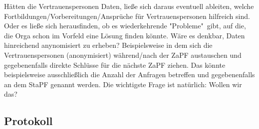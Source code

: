     Hätten die Vertrauenspersonen Daten, ließe sich daraus eventuell ableiten, welche Fortbildungen/Vorbereitungen/Ansprüche für Vertrauenspersonen hilfreich sind. Oder es ließe sich herausfinden, ob es wiederkehrende "Probleme"\ gibt, auf die, die Orga schon im Vorfeld eine Lösung finden könnte.
    Wäre es denkbar, Daten hinreichend anynomisiert zu erheben? Beispielsweise in dem sich die Vertrauenspersonen (anonymisiert) während/nach der ZaPF austauschen und gegebenenfalls direkte Schlüsse für die nächste ZaPF ziehen. Das könnte beispielsweise ausschließlich die Anzahl der Anfragen betreffen und gegebenenfalls an dem StaPF genannt werden.
    Die wichtigste Frage ist natürlich: Wollen wir das?

  \subsection*{Protokoll}
